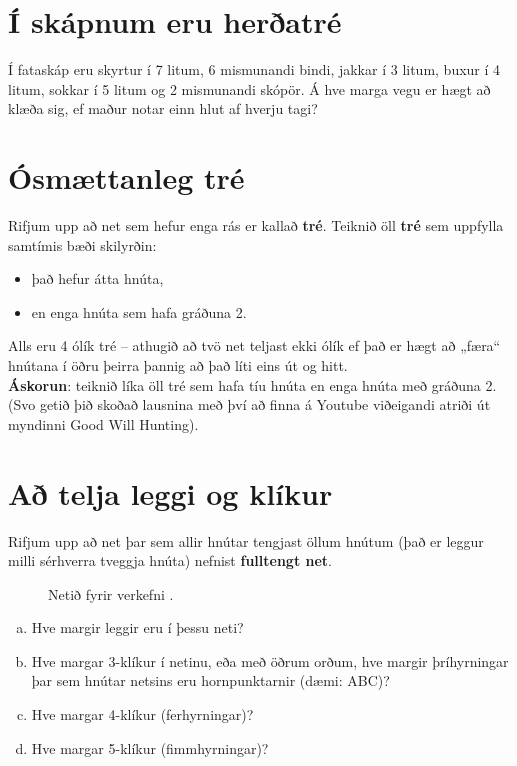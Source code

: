 \documentclass[b5paper,12pt]{book}
\renewcommand*\thesection{\arabic{section}}
\begin{document}
\section{Í skápnum eru herðatré}
Í fataskáp eru skyrtur í 7 litum, 6 mismunandi bindi, jakkar í 3 litum, buxur í 4 litum, sokkar í 5 litum og 2 mismunandi skópör. Á hve marga vegu er hægt að klæða sig, ef maður notar einn hlut af hverju tagi? 

\section{Ósmættanleg tré}
Rifjum upp að net sem hefur enga rás er kallað \textbf{tré}. Teiknið öll \textbf{tré} sem uppfylla samtímis bæði skilyrðin:
\begin{itemize}
    \item það hefur átta hnúta,
    \item en enga hnúta sem hafa gráðuna 2.
\end{itemize}
Alls eru 4 ólík tré -- athugið að tvö net teljast ekki ólík ef það er hægt að „færa“ hnútana í öðru þeirra þannig að það líti eins út og hitt.\\
\textbf{Áskorun}: teiknið líka öll tré sem hafa tíu hnúta en enga hnúta með gráðuna 2. (Svo getið þið skoðað lausnina með því að finna á Youtube viðeigandi atriði út myndinni Good Will Hunting).

\section{Að telja leggi og klíkur}
Rifjum upp að net þar sem allir hnútar tengjast öllum hnútum (það er leggur milli sérhverra tveggja hnúta) nefnist \textbf{fulltengt net}. 
\begin{figure}[h]
    \centering
{}
\caption*{Netið fyrir verkefni \thesection{}.}
\end{figure}
\begin{enumerate}[(a)]
    \item Hve margir leggir eru í þessu neti? 
    \item Hve margar 3-klíkur í netinu, eða með öðrum orðum, hve margir þríhyrningar þar sem hnútar netsins eru hornpunktarnir (dæmi: ABC)?
    \item Hve margar 4-klíkur (ferhyrningar)?
    \item Hve margar 5-klíkur (fimmhyrningar)?
\end{enumerate}
\end{document}
